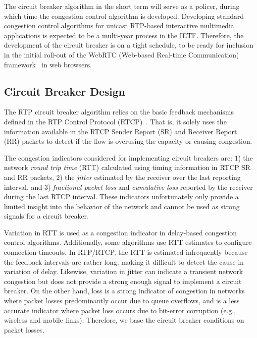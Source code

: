 The circuit breaker algorithm in the short term will serve as a policer,
during which time the congestion control algorithm is developed. Developing
standard congestion control algorithms for unicast RTP-based interactive
multimedia applications is expected to be a multi-year process in the IETF.
Therefore, the development of the circuit breaker is on a tight schedule, to
be ready for inclusion in the initial roll-out of the WebRTC (Web-based 
Real-time Communication) framework~\cite{jennings:2013:webrtc} in web browsers.

\subsection{Circuit Breaker Design}
\label{fw.cb.design}

The RTP circuit breaker algorithm relies on the basic feedback mechanisms
defined in the RTP Control Protocol (RTCP)~\cite{rfc3550}. That is, it solely
uses the information available in the RTCP Sender Report (SR) and Receiver
Report (RR) packets to detect if the flow is overusing the capacity or causing
congestion.

The congestion indicators considered for implementing circuit breakers are: 1)
the network \emph{round trip time} (RTT) calculated  using timing information
in RTCP SR and RR packets, 2) the \emph{jitter} estimated by the receiver over the
last reporting interval, and 3) \emph{fractional packet loss} and \emph{cumulative
loss} reported by the receiver during the last RTCP interval. These
indicators  unfortunately only provide a limited insight into the behavior of
the network and cannot be used as strong signals for a circuit breaker.

Variation in RTT is used as a congestion indicator in delay-based congestion
control algorithms. Additionally, some algorithms use RTT estimates to
configure connection timeouts. In RTP/RTCP, the RTT is estimated infrequently
because the feedback intervals are rather long, making it difficult to detect
the cause in variation of delay. Likewise, variation in jitter can indicate a
transient network congestion but does not provide a strong enough signal to implement
a circuit breaker. On the other hand, loss is a strong indicator of congestion
in networks where packet losses predominantly occur due to queue overflows, and
is a less accurate indicator where packet loss occurs due to bit-error
corruption (e.g., wireless and mobile links). Therefore, we base the circuit
breaker conditions on packet losses. 


